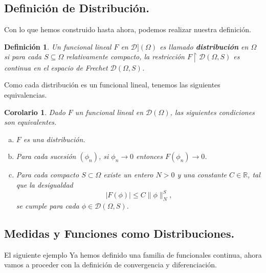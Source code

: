\documentclass[letter,12pt]{article}
\newcommand\norm[1]{\lVert#1\rVert}
\newtheorem{definition}[theorem]{Definición}
\newtheorem{corollary}[theorem]{Corolario}
\begin{document}
\subsection{Definición de Distribución.}

Con lo que hemos construido hasta ahora, podemos realizar nuestra definición.

\begin{definition}\normalfont
	Un funcional lineal $ F $ en $ \mathscr{D}](\Omega) $ es llamado
	\textbf{distribución} en $ \Omega $ si para cada $ S\subseteq\Omega $ relativamente
	compacto, la restricción $ F\restriction{\mathscr{D}(\Omega, S)} $ es continua en
	el espacio de Frechet $ \mathscr{D}(\Omega, S) $.
\end{definition}

Como cada distribución es un funcional lineal, tenemos las siguientes equivalencias.
\begin{corollary}\normalfont
	Dado $ F $ un funcional lineal en $ \mathscr{D}(\Omega) $, las siguientes
	condiciones son equivalentes.
	\begin{enumerate}[(a)]
		\item $ F $ es una distribución.
		\item Para cada sucesión $ (\phi_n) $, si $ \phi_n \to 0 $ entonces
		$ F(\phi_n) \to 0 $.
		\item Para cada compacto $ S\subset\Omega $ existe un entero
		$ N > 0 $  y una constante $ C \in \mathbb{R} $, tal que la
		desigualdad
		\begin{equation}
			|F(\phi)| \leq C \norm{\phi}^S_N,
		\end{equation}
		se cumple para cada $ \phi \in \mathscr{D}(\Omega, S)$.
	\end{enumerate}
\end{corollary}

\subsection{Medidas y Funciones como Distribuciones.}

El siguiente ejemplo
Ya hemos definido una familia de funcionales continua, ahora vamos a proceder con
la definición de convergencia y diferenciación.
\cite{Rudin}
\cite{Edwards}
\cite{Halperin}
\cite{Strichartz}
\printbibliography
\end{document}
